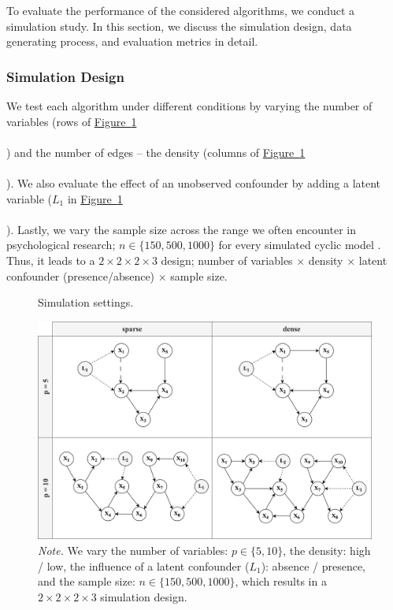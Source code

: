 \documentclass[11pt]{article}
\newcommand*{\figref}[2][]{%
  \hyperref[{fig:#2}]{%
    Figure~\ref*{fig:#2}%
    \ifx\\#1\\%
    \else
      #1%
    \fi
  }%
}
\begin{document}
To evaluate the performance of the considered algorithms, we conduct a simulation study. In this section, we discuss the simulation design, data generating process, and evaluation metrics in detail.


\subsubsection{Simulation Design}
We test each algorithm under different conditions by varying the number of variables (rows of \figref{6}) and the number of edges -- the density (columns of \figref{6}). We also evaluate the effect of an unobserved confounder by adding a latent variable ($L_1$ in \figref{6}). Lastly, we vary the sample size across the range we often encounter in psychological research; $n \in \{150, 500, 1000\}$ for every simulated cyclic model \citep{constantin2022}. Thus, it leads to a $2 \times 2 \times 2 \times 3$ design; number of variables $\times$ density $\times$ latent confounder (presence/absence) $\times$ sample size.

\vspace{2mm}

\begin{figure}[H]
    \centering
        \caption{Simulation settings.}
        \vspace{1mm}
        \includegraphics[width=1\textwidth]{figures/simsetting3.png}
        \vspace*{-4mm}
        \caption*{\small{\textit{Note.} We vary the number of variables: $p \in \{5, 10\}$, the density: high / low, the influence of a latent confounder ($L_1$): absence / presence, and the sample size: $n \in \{150, 500, 1000\}$, which results in a $2 \times 2 \times 2 \times 3$ simulation design.}}
    \label{fig:6}
\end{figure}
\end{document}
